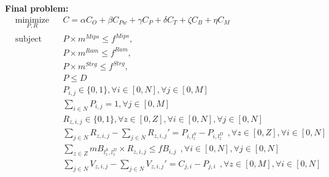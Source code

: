 \documentclass{article}
\begin{document}
\pagebreak
\noindent\textbf{Final problem:}\\[6pt]
\begin{equation*}
\begin{aligned}
& \underset{P, R}{\text{minimize}}
& & C = \alpha C_O + \beta C_{Pw} + \gamma C_P  + \delta C_T + \zeta C_B + \eta C_M\\
& \text{subject to}
& & P\times m^{Mips} \leq f^{Mips}, \\
&&& P\times m^{Ram} \leq f^{Ram}, \\
&&& P\times m^{Strg} \leq f^{Strg}, \\
&&& P\leq D\\
&&& P_{i,j} \in \{0, 1\}, \forall i \in [0, N], \forall j \in [0, M]\\
&&& \sum_{i \in N} P_{i,j} = 1, \forall j \in [0, M]\\
&&& R_{z, i,j} \in \{0, 1\}, \forall z \in [0, Z], \forall i \in [0, N], \forall j \in [0, N]\\
&&& \sum_{j\in N} R_{z, i, j} - \sum_{j\in N} R_{z, i, j}' = P_{i, l^S_z} - P_{i, l^D_z}~~, \forall z \in [0, Z], \forall i \in [0, N]\\
&&& \sum_{z\in Z} mB_{l^S_z,l^D_z} \times R_{z, i,j} \le fB_{i,j}~~, \forall i \in [0, N], \forall j \in [0, N]\\
&&& \sum_{j\in N} V_{z, i, j} - \sum_{j\in N} V_{z, i, j}' = C_{j, i} - P_{j, i}~~, \forall z \in [0, M], \forall i \in [0, N]
\end{aligned}
\end{equation*}
\end{document}
